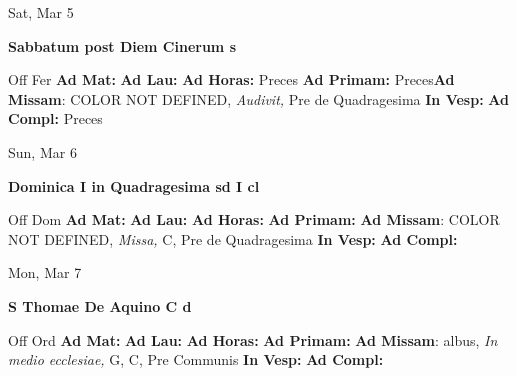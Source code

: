 \documentclass[10pt]{memoir}
\begin{document}
\begin{center}
\begin{minipage}{3.5in}
\vspace{2em}
\begin{center}Sat, Mar 5
\end{center}
\textbf{ \large Sabbatum post Diem Cinerum
\textnormal{\normalsize s}}

\begin{justify}Off Fer
\textbf{Ad Mat: }
\textbf{Ad Lau: }
\textbf{Ad Horas: }Preces
\textbf{Ad Primam: }Preces\textbf{Ad Missam}: COLOR NOT DEFINED, \textit{Audivit,} Pre de Quadragesima
\textbf{In Vesp: }
\textbf{Ad Compl: }Preces
\end{justify}
\end{minipage}
\end{center}

\begin{center}
\begin{minipage}{3.5in}
\vspace{2em}
\begin{center}Sun, Mar 6
\end{center}
\textbf{ \large Dominica I in Quadragesima
\textnormal{\normalsize sd I cl}}

\begin{justify}Off Dom
\textbf{Ad Mat: }
\textbf{Ad Lau: }
\textbf{Ad Horas: }
\textbf{Ad Primam: }\textbf{Ad Missam}: COLOR NOT DEFINED, \textit{Missa,} C, Pre de Quadragesima
\textbf{In Vesp: }
\textbf{Ad Compl: }
\end{justify}
\end{minipage}
\end{center}

\begin{center}
\begin{minipage}{3.5in}
\vspace{2em}
\begin{center}Mon, Mar 7
\end{center}
\textbf{ \large S Thomae De Aquino C
\textnormal{\normalsize d}}

\begin{justify}Off Ord
\textbf{Ad Mat: }
\textbf{Ad Lau: }
\textbf{Ad Horas: }
\textbf{Ad Primam: }\textbf{Ad Missam}: albus, \textit{In medio ecclesiae,} G, C, Pre Communis
\textbf{In Vesp: }
\textbf{Ad Compl: }
\end{justify}
\end{minipage}
\end{center}
\end{document}
